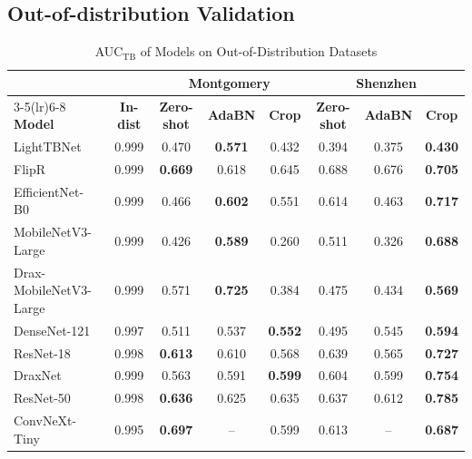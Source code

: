 \documentclass[conference, letterpaper]{IEEEtran}
\begin{document}
\subsection{Out-of-distribution Validation}
\label{subsec:external_validation}

\begin{table}[!t]
\renewcommand{\arraystretch}{1.2}
\centering
\begin{threeparttable}
\caption{AUC$_{\text{TB}}$ of Models on Out-of-Distribution Datasets}
\label{tab:external_validation}
\small
\begin{tabular}{@{}l c ccc ccc@{}}
\toprule
 & & \multicolumn{3}{c}{\textbf{Montgomery}} & \multicolumn{3}{c}{\textbf{Shenzhen}} \\
\cmidrule(lr){3-5}\cmidrule(lr){6-8}
\textbf{Model} & \textbf{In-dist} & \textbf{Zero-shot} & \textbf{AdaBN} & \textbf{Crop} & \textbf{Zero-shot} & \textbf{AdaBN} & \textbf{Crop} \\
\midrule
LightTBNet~\cite{capellan2023lighttbnet} & 0.999 & 0.470 & \textbf{0.571} & 0.432 & 0.394 & 0.375          & \textbf{0.430} \\
FlipR                  & 0.999 & \textbf{0.669} & 0.618          & 0.645 & 0.688 & 0.676          & \textbf{0.705} \\
EfficientNet-B0~\cite{tan2019efficientnet} & 0.999 & 0.466 & \textbf{0.602} & 0.551 & 0.614 & 0.463          & \textbf{0.717} \\
MobileNetV3-Large~\cite{howard2019mobilenetv3} & 0.999 & 0.426 & \textbf{0.589} & 0.260 & 0.511 & 0.326          & \textbf{0.688} \\
Drax-MobileNetV3-Large & 0.999 & 0.571 & \textbf{0.725} & 0.384 & 0.475 & 0.434          & \textbf{0.569} \\
DenseNet-121~\cite{huang2017densenet} & 0.997 & 0.511 & 0.537          & \textbf{0.552} & 0.495 & 0.545 & \textbf{0.594} \\
ResNet-18~\cite{he2016resnet} & 0.998 & \textbf{0.613} & 0.610 & 0.568 & 0.639 & 0.565          & \textbf{0.727} \\
DraxNet                & 0.999 & 0.563 & 0.591          & \textbf{0.599} & 0.604 & 0.599 & \textbf{0.754} \\
ResNet-50~\cite{he2016resnet} & 0.998 & \textbf{0.636} & 0.625 & 0.635 & 0.637 & 0.612          & \textbf{0.785} \\
ConvNeXt-Tiny~\cite{liu2022convnext} & 0.995 & \textbf{0.697} & --    & 0.599 & 0.613 & --             & \textbf{0.687} \\

\end{tabular}
\end{threeparttable}
\end{table}
\end{document}
